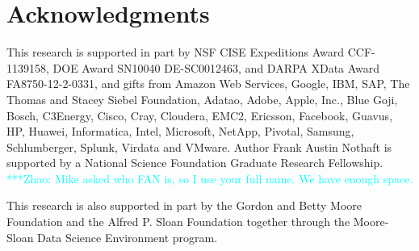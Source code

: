 \documentclass[conference]{IEEEtran}
\newcommand{\zhaonote}[1]{{\textcolor{cyan}    { ***Zhao:      #1 }}}
\newcommand{\zhaonote}[1]{}
\begin{document}
\section{Acknowledgments}

This research is supported in part by NSF CISE Expeditions Award CCF-1139158, DOE Award SN10040 DE-SC0012463, and DARPA XData Award FA8750-12-2-0331, and gifts from Amazon Web Services, Google, IBM, SAP, The Thomas and Stacey Siebel Foundation, Adatao, Adobe, Apple, Inc., Blue Goji, Bosch, C3Energy, Cisco, Cray, Cloudera, EMC2, Ericsson, Facebook, Guavus, HP, Huawei, Informatica, Intel, Microsoft, NetApp, Pivotal, Samsung, Schlumberger, Splunk, Virdata and VMware. Author Frank Austin Nothaft is supported by a National Science Foundation Graduate Research Fellowship.
\zhaonote{Mike asked who FAN is, so I use your full name. We have enough space.}

This research is also supported in part by the Gordon and Betty Moore
Foundation and the Alfred P. Sloan Foundation together through the
Moore-Sloan Data Science Environment program.
%

%
%




\end{document}
